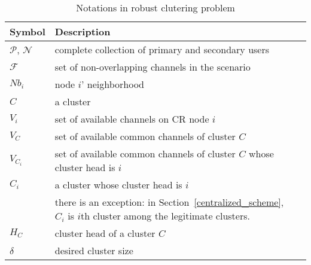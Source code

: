 
\begin{table}[ht!]
\caption{Notations in robust clutering problem}\label{tab1}
\centering
\begin{tabular}{llr}
\toprule
Symbol & Description \\
\midrule
$\mathcal{P}$, $\mathcal{N}$  & complete collection of primary and secondary users\\
$\mathcal{F}$ & set of non-overlapping channels in the scenario\\
$Nb_i$ & node $i$' neighborhood     \\
$C$ & a cluster \\
$V_i$   & set of available channels on CR node $i$  \\
$V_C$   & set of available common channels of cluster $C$  \\
$V_{C_i}$   & set of available common channels of cluster $C$ whose cluster head is $i$\\
$C_i$ & a cluster whose cluster head is $i$ \\
& there is an exception: in Section~\ref{centralized_scheme}, $C_i$ is $i$th cluster among the legitimate clusters.\\
$H_C$ & cluster head of a cluster $C$\\
$\delta$ & desired cluster size\\

\end{tabular}
\end{table}
